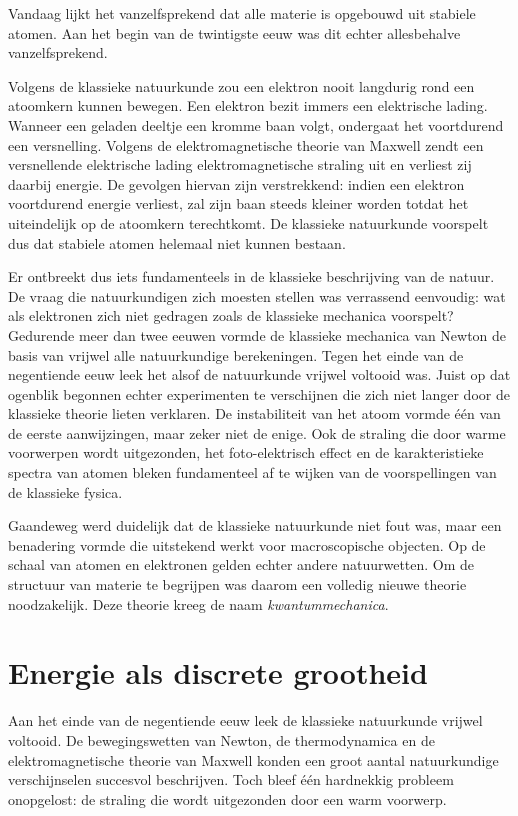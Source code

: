 Vandaag lijkt het vanzelfsprekend dat alle materie is opgebouwd uit stabiele atomen. Aan het begin van de twintigste eeuw was dit echter allesbehalve vanzelfsprekend.

Volgens de klassieke natuurkunde zou een elektron nooit langdurig rond een atoomkern kunnen bewegen. Een elektron bezit immers een elektrische lading. Wanneer een geladen deeltje een kromme baan volgt, ondergaat het voortdurend een versnelling. Volgens de elektromagnetische theorie van Maxwell zendt een versnellende elektrische lading elektromagnetische straling uit en verliest zij daarbij energie. De gevolgen hiervan zijn verstrekkend: indien een elektron voortdurend energie verliest, zal zijn baan steeds kleiner worden totdat het uiteindelijk op de atoomkern terechtkomt. De klassieke natuurkunde voorspelt dus dat stabiele atomen helemaal niet kunnen bestaan.

Er ontbreekt dus iets fundamenteels in de klassieke beschrijving van de natuur. De vraag die natuurkundigen zich moesten stellen was verrassend eenvoudig: wat als elektronen zich niet gedragen zoals de klassieke mechanica voorspelt? Gedurende meer dan twee eeuwen vormde de klassieke mechanica van Newton de basis van vrijwel alle natuurkundige berekeningen. Tegen het einde van de negentiende eeuw leek het alsof de natuurkunde vrijwel voltooid was. Juist op dat ogenblik begonnen echter experimenten te verschijnen die zich niet langer door de klassieke theorie lieten verklaren. De instabiliteit van het atoom vormde \'e\'en van de eerste aanwijzingen, maar zeker niet de enige. Ook de straling die door warme voorwerpen wordt uitgezonden, het foto-elektrisch effect en de karakteristieke spectra van atomen bleken fundamenteel af te wijken van de voorspellingen van de klassieke fysica.

Gaandeweg werd duidelijk dat de klassieke natuurkunde niet fout was, maar een benadering vormde die uitstekend werkt voor macroscopische objecten. Op de schaal van atomen en elektronen gelden echter andere natuurwetten. Om de structuur van materie te begrijpen was daarom een volledig nieuwe theorie noodzakelijk. Deze theorie kreeg de naam \emph{kwantummechanica}.

\section{Energie als discrete grootheid}

Aan het einde van de negentiende eeuw leek de klassieke natuurkunde vrijwel voltooid. De bewegingswetten van Newton, de thermodynamica en de elektromagnetische theorie van Maxwell konden een groot aantal natuurkundige verschijnselen succesvol beschrijven. Toch bleef één hardnekkig probleem onopgelost: de straling die wordt uitgezonden door een warm voorwerp.

